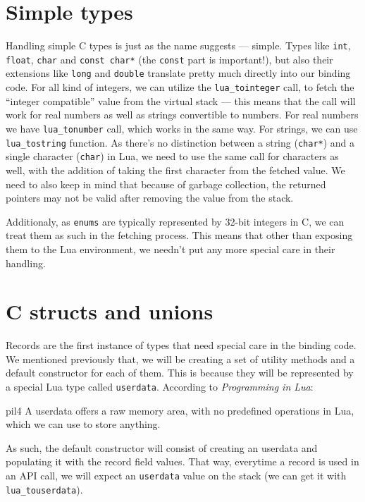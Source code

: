 \documentclass[polish, english]{iithesis}
\begin{document}
  \section{Simple types}
    Handling simple C types is just as the name suggests --- simple.
    Types like \texttt{int}, \texttt{float}, \texttt{char} and \texttt{const char*} (the \texttt{const} part is important!), but also their extensions like \texttt{long} and \texttt{double} translate pretty much directly into our binding code.
    For all kind of integers, we can utilize the \texttt{lua\_tointeger} call, to fetch the ``integer compatible'' value from the virtual stack --- this means that the call will work for real numbers as well as strings convertible to numbers.
    For real numbers we have \texttt{lua\_tonumber} call, which works in the same way.
    For strings, we can use \texttt{lua\_tostring} function. 
    As there's no distinction between a string (\texttt{char*}) and a single character (\texttt{char}) in Lua, we need to use the same call for characters as well, with the addition of taking the first character from the fetched value.
    We need to also keep in mind that because of garbage collection, the returned pointers may not be valid after removing the value from the stack.

    Additionaly, as \texttt{enums} are typically represented by 32-bit integers in C, we can treat them as such in the fetching process.
    This means that other than exposing them to the Lua environment, we needn't put any more special care in their handling.
  \section{C structs and unions}
    Records are the first instance of types that need special care in the binding code.
    We mentioned previously that, we will be creating a set of utility methods and a default constructor for each of them.
    This is because they will be represented by a special Lua type called \texttt{userdata}. 
    According to \textit{Programming in Lua}:
    \begin{displaycquote}{pil4}
      A userdata offers a raw memory area, with no predefined operations in Lua, which we can use to store anything. 
    \end{displaycquote}
    As such, the default constructor will consist of creating an userdata and populating it with the record field values.
    That way, everytime a record is used in an API call, we will expect an \texttt{userdata} value on the stack (we can get it with \texttt{lua\_touserdata}).
\end{document}
